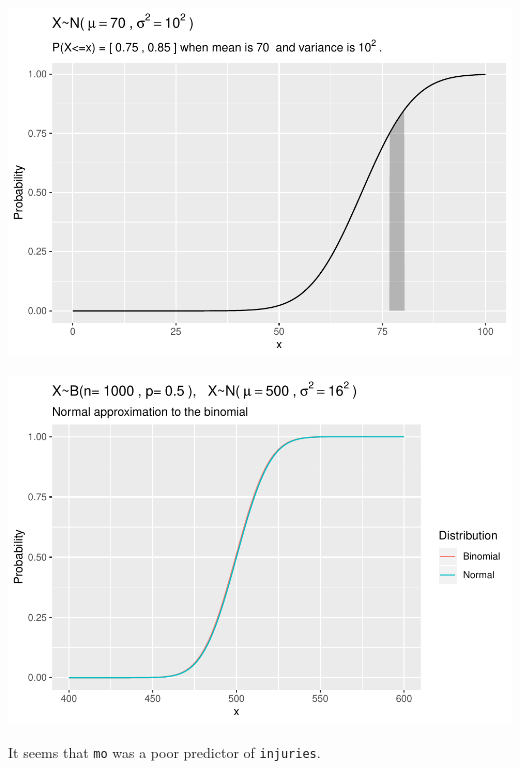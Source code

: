 \documentclass[
]{book}
\newenvironment{Shaded}{\begin{snugshade}}{\end{snugshade}}
\newcommand{\DataTypeTok}[1]{\textcolor[rgb]{0.13,0.29,0.53}{#1}}
\newcommand{\KeywordTok}[1]{\textcolor[rgb]{0.13,0.29,0.53}{\textbf{#1}}}
\newcommand{\NormalTok}[1]{#1}
\newcommand{\OperatorTok}[1]{\textcolor[rgb]{0.81,0.36,0.00}{\textbf{#1}}}
\newcommand{\StringTok}[1]{\textcolor[rgb]{0.31,0.60,0.02}{#1}}
\begin{document}
\includegraphics{data-sci_files/figure-latex/unnamed-chunk-24-1.pdf}

\begin{Shaded}
\end{Shaded}

\includegraphics{data-sci_files/figure-latex/unnamed-chunk-25-1.pdf}

It seems that \texttt{mo} was a poor predictor of \texttt{injuries}.
\end{document}
